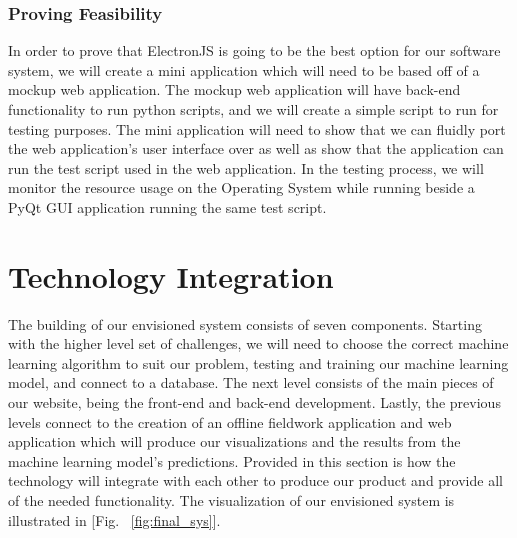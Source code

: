 \documentclass[12pt,journal,compsoc]{IEEEtran}
\newenvironment{subs}
  {\adjustwidth{1em}{0pt}}
  {\endadjustwidth}
\begin{document}
\begin{subs}
\begin{subs}
\subsubsection{Proving Feasibility}
In order to prove that ElectronJS is going to be the best option for our software system, we will create a mini application which will need to be based off of a mockup web application. The mockup web application will have back-end functionality to run python scripts, and we will create a simple script to run for testing purposes. The mini application will need to show that we can fluidly port the web application’s user interface over as well as show that the application can run the test script used in the web application. In the testing process, we will monitor the resource usage on the Operating System while running beside a PyQt GUI application running the same test script. 
\end{subs}

\end{subs}

\section{Technology Integration}
The building of our envisioned system consists of seven components. Starting with the higher level set of challenges, we will need to choose the correct machine learning algorithm to suit our problem, testing and training our machine learning model, and connect to a database. The next level consists of the main pieces of our website, being the front-end and back-end development. Lastly, the previous levels connect to the creation of an offline fieldwork application and web application which will produce our visualizations and the results from the machine learning model’s predictions. Provided in this section is how the technology will integrate with each other to produce our product and provide all of the needed functionality. The visualization of our envisioned system is illustrated in [Fig. ~\ref{fig:final_sys}].
\end{document}

